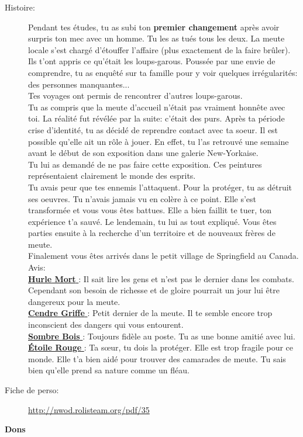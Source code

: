 \documentclass[oneside,12pt]{book}
\newcommand{\Lynn}{\textbf{Étoile Rouge} }
\newcommand{\Luke}{\textbf{Cendre Griffe} }
\newcommand{\Peter}{\textbf{Hurle Mort} }
\newcommand{\Leonard}{\textbf{Sombre Bois} }
\begin{document}
\begin{flushleft}
\begin{description}
\item[Histoire:]{ 
Pendant tes études, tu as subi ton \textbf{premier changement} après avoir surpris ton mec avec un homme. Tu les as tués tous les deux.
La meute locale s'est chargé d'étouffer l'affaire (plus exactement de la faire brûler).\\
Ils t'ont appris ce qu'était les loups-garous. Poussée par une envie de comprendre, tu as enquêté sur ta famille pour y voir quelques irrégularités: des personnes manquantes...\\
Tes voyages ont permis de rencontrer d'autres loups-garous.\\
Tu as compris que la meute d'accueil n'était pas vraiment honnête avec toi. La réalité fut révélée par la suite: c'était des purs.
Après ta période crise d'identité, tu as décidé de reprendre contact avec ta soeur. Il est possible qu'elle ait un rôle à jouer.
En effet, tu l'as retrouvé une semaine avant le début de son exposition dans une galerie New-Yorkaise.\\
Tu lui as demandé de ne pas faire cette exposition. Ces peintures représentaient clairement le monde des esprits.\\
Tu avais peur que tes ennemis l'attaquent. Pour la protéger, tu as détruit ses oeuvres. Tu n'avais jamais vu en colère à ce point.
Elle s'est transformée et vous vous êtes battues. Elle a bien faillit te tuer, ton expérience t'a sauvé. Le lendemain, tu lui as tout expliqué.
Vous êtes parties ensuite à la recherche d'un territoire et de nouveaux frères de meute.\\
Finalement vous êtes arrivés dans le petit village de Springfield au Canada.  \\
Avis:\\
\underline{\Peter} : Il sait lire les gens et n'est pas le dernier dans les combats. Cependant son besoin de richesse et de gloire pourrait un jour lui être dangereux pour la meute. \\
\underline{\Luke} : Petit dernier de la meute. Il te semble encore trop inconscient des dangers qui vous entourent.\\
\underline{\Leonard} : Toujours fidèle au poste. Tu as une bonne amitié avec lui.\\
\underline{\Lynn}: Ta sœur, tu dois la protéger. Elle est trop fragile pour ce monde. Elle t'a bien aidé pour trouver des camarades de meute. Tu sais bien qu'elle prend sa nature comme un fléau.\\
}
\item[Fiche de perso:]{\href{http://nwod.rolisteam.org/pdf/35}{http://nwod.rolisteam.org/pdf/35}}
\end{description}
\clearpage
\textbf{\large Dons} 
\vspace{0.5cm}


\end{flushleft}
\end{document}
